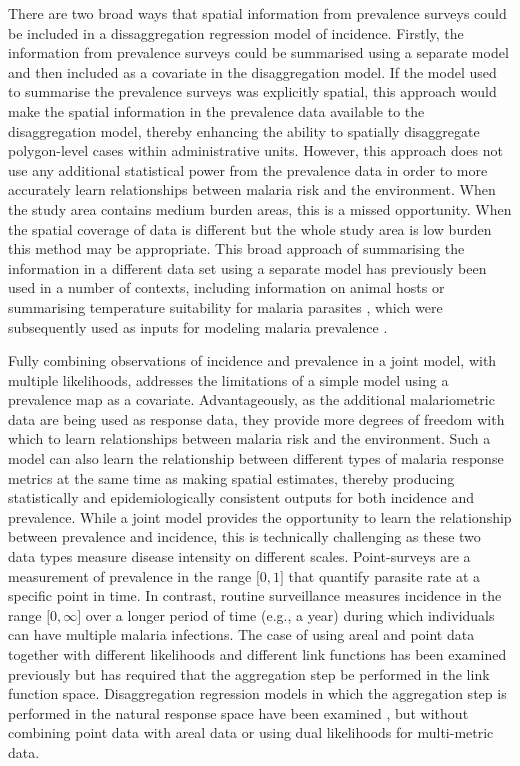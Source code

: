 \documentclass{statsoc}
\begin{document}
There are two broad ways that spatial information from prevalence surveys could be included in a dissaggregation regression model of incidence.
Firstly, the information from prevalence surveys could be summarised using a separate model and then included as a covariate in the disaggregation model.
If the model used to summarise the prevalence surveys was explicitly spatial, this approach would make the spatial information in the prevalence data available to the disaggregation model, thereby enhancing the ability to spatially disaggregate polygon-level cases within administrative units.
However, this approach does not use any additional statistical power  from the prevalence data in order to more accurately learn relationships between malaria risk and the environment.
When the study area contains medium burden areas, this is a missed opportunity.
When the spatial coverage of data is different but the whole study area is low burden this method may be appropriate.
This broad approach of summarising the information in a different data set using a separate model has previously been used in a number of contexts, including information on animal hosts \citep{shearer2016estimating} or summarising temperature suitability for malaria parasites \citep{weiss2014air}, which were subsequently used as inputs for modeling malaria prevalence \citep{bhatt2015effect, weiss2019mapping}.


Fully combining observations of incidence and prevalence in a joint model, with multiple likelihoods, addresses the limitations of a simple model using a prevalence map as a covariate.
Advantageously, as the additional malariometric data are being used as response data, they provide more degrees of freedom with which to learn relationships between malaria risk and the environment.
Such a model can also learn the relationship between different types of malaria response metrics at the same time as making spatial estimates, thereby producing statistically and epidemiologically consistent outputs for both incidence and prevalence.
While a joint model provides the opportunity to learn the relationship between prevalence and incidence, this is technically challenging as these two data types measure disease intensity on different scales.
Point-surveys are a measurement of prevalence in the range $\lbrack 0, 1\rbrack$ that quantify parasite rate at a specific point in time.
In contrast, routine surveillance measures incidence in the range $\lbrack 0, \infty\rbrack$ over a longer period of time (e.g., a year) during which individuals can have multiple malaria infections.
The case of using areal and point data together with different likelihoods and different link functions has been examined previously \citep{wang2018generalized} but has required that the aggregation step be performed in the link function space. 
Disaggregation regression models in which the aggregation step is performed in the natural response space have been examined \citep{wilson2017pointless, taylor2017continuous}, but without combining point data with areal data or using dual likelihoods for multi-metric data.
\end{document}

